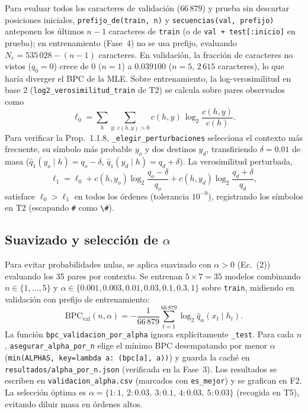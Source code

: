 \documentclass[11pt,letterpaper]{article}
\begin{document}
	Para evaluar todos los caracteres de validación ($66\,879$) y prueba sin descartar posiciones iniciales, \texttt{prefijo\_de(train, n)} y \texttt{secuencias(val, prefijo)} anteponen los últimos $n-1$ caracteres de \texttt{train} (o de \texttt{val + test[:inicio]} en prueba); en entrenamiento (Fase~4) no se usa prefijo, evaluando $N_e=535\,028-(n-1)$ caracteres. En validación, la fracción de caracteres no vistos ($\hat q_0=0$) crece de $0$ ($n=1$) a $0.039100$ ($n=5$, $2\,615$ caracteres), lo que haría diverger el BPC de la MLE. Sobre entrenamiento, la log-verosimilitud en base 2 (\texttt{log2\_verosimilitud\_train} de T2) se calcula sobre pares observados como
	\begin{equation}
		\ell_0=\sum_{h}\sum_{y:\,c(h,y)>0} c(h,y)\,\log_2\frac{c(h,y)}{c(h)}.
		\label{eq:loglik0}
	\end{equation}
	Para verificar la Prop.~1.1.8, \texttt{\_elegir\_perturbaciones} selecciona el contexto más frecuente, su símbolo más probable $y_o$ y dos destinos $y_d$, transfiriendo $\delta=0.01$ de masa ($\hat q_1(y_o\mid h)=q_o-\delta$, $\hat q_1(y_d\mid h)=q_d+\delta$). La verosimilitud perturbada,
	\begin{equation}
		\ell_1=\ell_0+c(h,y_o)\log_2\frac{q_o-\delta}{q_o}
		+c(h,y_d)\log_2\frac{q_d+\delta}{q_d},
		\label{eq:loglik1}
	\end{equation}
	satisface $\ell_0>\ell_1$ en todos los órdenes (tolerancia $10^{-9}$), registrando los símbolos en T2 (escapando \texttt{\#} como \texttt{\textbackslash\#}).
	
	\subsection{Suavizado y selección de $\alpha$}
	Para evitar probabilidades nulas, se aplica suavizado con $\alpha>0$ (Ec.~(2)) evaluando los 35 pares por contexto. Se entrenan $5\times7=35$ modelos combinando $n\in\{1,\dots,5\}$ y $\alpha\in\{0.001,0.003,0.01,0.03,0.1,0.3,1\}$ sobre \texttt{train}, midiendo en validación con prefijo de entrenamiento:
	\begin{equation}
		\mathrm{BPC}_{\mathrm{val}}(n,\alpha)
		=-\frac{1}{66\,879}\sum_{t=1}^{66\,879}\log_2\hat q_\alpha(x_t\mid h_t).
		\label{eq:bpc_val}
	\end{equation}
	La función \texttt{bpc\_validacion\_por\_alpha} ignora explícitamente \texttt{\_test}. Para cada $n$, \texttt{asegurar\_alpha\_por\_n} elige el mínimo BPC desempatando por menor $\alpha$ (\texttt{min(ALPHAS, key=lambda a: (bpc[a], a))}) y guarda la caché en \texttt{resultados/alpha\_por\_n.json} (verificada en la Fase~3). Los resultados se escriben en \texttt{validacion\_alpha.csv} (marcados con \texttt{es\_mejor}) y se grafican en F2. La selección óptima es $\alpha=\{1:1,\ 2:0.03,\ 3:0.1,\ 4:0.03,\ 5:0.03\}$ (recogida en T5), evitando diluir masa en órdenes altos.
	
\end{document}
